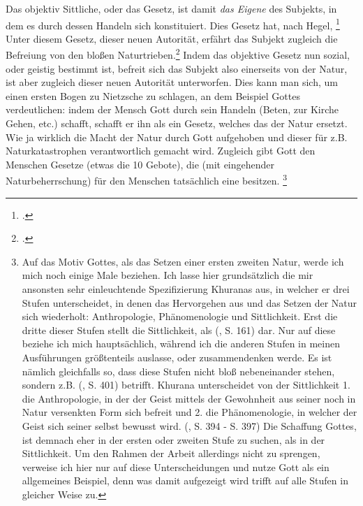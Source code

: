 \documentclass[12pt, a4paper, openany]{report}
\begin{document}
Das objektiv Sittliche, oder das Gesetz, ist damit \emph{das Eigene} des Subjekts, in dem es durch dessen Handeln sich konstituiert. 
Dies Gesetz hat, nach Hegel, \footcite[][§146, S. 164.]{hegel_grundlinien_2017}
Unter diesem Gesetz, dieser neuen Autorität, erfährt das Subjekt zugleich die Befreiung von den bloßen Naturtrieben.\footcite[Vlg.][§149, S. 164]{hegel_grundlinien_2017} 
Indem das objektive Gesetz nun sozial, oder geistig bestimmt ist, befreit sich das Subjekt also einerseits von der Natur, ist aber zugleich dieser neuen Autorität unterworfen. 
Dies kann man sich, um einen ersten Bogen zu Nietzsche zu schlagen, an dem Beispiel Gottes verdeutlichen: 
indem der Mensch Gott durch sein Handeln (Beten, zur Kirche Gehen, etc.) schafft, schafft er ihn als ein Gesetz, welches das der Natur ersetzt. 
Wie ja wirklich die Macht der Natur durch Gott aufgehoben und dieser für z.B. Naturkatastrophen verantwortlich gemacht wird.
Zugleich gibt Gott den Menschen Gesetze (etwas die 10 Gebote), die (mit eingehender Naturbeherrschung) für den Menschen tatsächlich eine  besitzen.
\footnote{%
    Auf das Motiv Gottes, als das Setzen einer ersten zweiten Natur, werde ich mich noch einige Male beziehen. 
    Ich lasse hier grundsätzlich die mir ansonsten sehr einleuchtende Spezifizierung Khuranas aus, in welcher er drei Stufen unterscheidet, in denen das Hervorgehen aus und das Setzen der Natur sich wiederholt: Anthropologie, Phänomenologie und Sittlichkeit.
    Erst die dritte dieser Stufen stellt die Sittlichkeit, als  (\cite{hegel_grundlinien_2017}, S. 161) dar.
    Nur auf diese beziehe ich mich hauptsächlich, während ich die anderen Stufen in meinen Ausführungen größtenteils auslasse, oder zusammendenken werde. 
    Es ist nämlich gleichfalls so, dass diese Stufen nicht bloß nebeneinander stehen, sondern z.B.  (\cite{khurana_freiheit_2017}, S. 401) betrifft.
    Khurana unterscheidet von der Sittlichkeit 1. die Anthropologie, in der der Geist mittels der Gewohnheit aus seiner noch in Natur versenkten Form sich befreit und 2. die Phänomenologie, in welcher der Geist sich seiner selbst bewusst wird. 
    (\cite{khurana_freiheit_2017}, S. 394 - S. 397)
    Die Schaffung Gottes, ist demnach eher in der ersten oder zweiten Stufe zu suchen, als in der Sittlichkeit. 
    Um den Rahmen der Arbeit allerdings nicht zu sprengen, verweise ich hier nur auf diese Unterscheidungen und nutze Gott als ein allgemeines Beispiel, denn was damit aufgezeigt wird trifft auf alle Stufen in gleicher Weise zu. 
}\\
\end{document}
